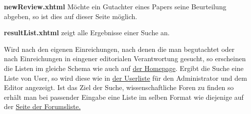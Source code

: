 \begin{samepage}
    \textbf{newReview.xhtml} Möchte ein Gutachter eines Papers seine Beurteilung abgeben, so ist dies auf dieser Seite möglich.
    \nopagebreak

\end{samepage}


\begin{samepage}
    \textbf{resultList.xhtml} zeigt alle Ergebnisse einer Suche an.
    \nopagebreak

    Wird nach den eigenen Einreichungen, nach denen die man begutachtet oder nach Einreichungen in eingener editorialen Verantwortung gesucht, so erscheinen die Listen im gleiche Schema wie auch auf \hyperref[flt:homepage]{der Homepage}.
    Ergibt die Suche eine Liste von User, so wird diese wie in \hyperref[flt:userList]{der Userliste} für den Administrator und dem Editor angezeigt.
    Ist das Ziel der Suche, wissenschaftliche Foren zu finden so erhält man bei passender Eingabe eine Liste im selben Format wie diejenige auf der \hyperref[flt:forumList]{Seite der Forumsliste.}
\end{samepage}


